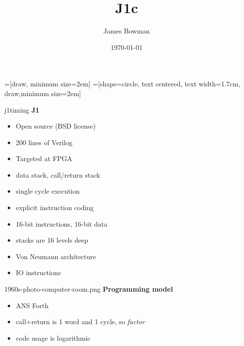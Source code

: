 \documentclass[compress,mathserif]{beamer}
\begin{document}
\title{J1c}   
\author{James Bowman} 
\date{\today} 

\frame{\titlepage} 

=[draw, minimum size=2em]
=[shape=circle, text centered, text width=1.7cm, draw,minimum size=2em]
\everymath{\displaystyle}

\begin{imageframe}{j1timing}
  {\bf\Huge J1}
\end{imageframe}

\begin{frame}
\begin{itemize}
   \item Open source (BSD license)
   \item 200 lines of Verilog
   \item Targeted at FPGA
\end{itemize}
\end{frame}

\begin{frame}
\begin{itemize}
   \item data stack, call/return stack
   \item single cycle execution
   \item explicit instruction coding
\end{itemize}
\end{frame}

\begin{frame}
\begin{itemize}
   \item 16-bit instructions, 16-bit data
   \item stacks are 16 levels deep
   \item Von Neumann architecture
   \item IO instructions
\end{itemize}
\end{frame}

\begin{imageframe}{1960s-photo-computer-room.png}
  {\bf\Huge Programming model}
\end{imageframe}

\begin{frame}
\begin{itemize}
   \item ANS Forth
   \item call+return is 1 word and 1 cycle, so \textit{factor}
   \item code usage is logarithmic
\end{itemize}
\end{frame}
\end{document}
